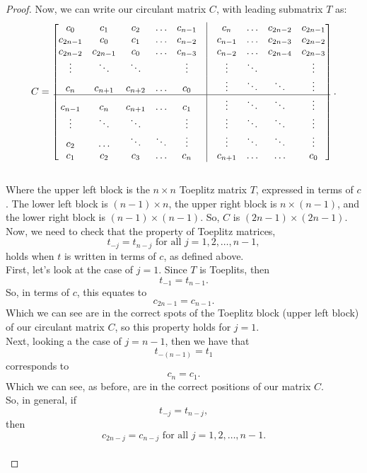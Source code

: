 \documentclass[12pt]{article}
\begin{document}
\begin{itemize}
\begin{proof}
Now, we can write our circulant matrix $C$, with leading submatrix $T$ as:\\

$$ C = \begin{bmatrix}
		c_0 & c_1 & c_2 & \hdots & c_{n-1} &\vline & c_n & \hdots & c_{2n-2} & c_{2n-1} \\
		c_{2n-1} & c_0 & c_1 & \hdots & c_{n-2} & \vline & c_{n-1} & \hdots & c_{2n-3} & c_{2n-2} \\
		c_{2n-2} & c_{2n-1} & c_0 & \hdots & c_{n-3} & \vline & c_{n-2} & \hdots & c_{2n-4} & c_{2n-3} \\
		\vdots & \ddots & \ddots & & \vdots & \vline & \vdots & \ddots & & \vdots \\
		c_n & c_{n+1} & c_{n+2} & \hdots & c_0 & \vline &  \vdots & \ddots & \ddots & \vdots \\
		\hline 
		c_{n-1} & c_n & c_{n+1} & \hdots & c_1 & \vline & \vdots & \ddots & \ddots & \vdots \\
		\vdots & \ddots & \ddots & & \vdots & \vline & \vdots & \ddots & \ddots & \vdots \\
		c_2 & \hdots & \ddots & \ddots & \vdots & \vline & \vdots & \ddots & \ddots & \vdots \\
		c_1 & c_2 & c_3 & \hdots & c_n & \vline & c_{n+1} & \hdots & \hdots & c_0
		\end{bmatrix}.$$\\
		
Where the upper left block is the $n\times n$ Toeplitz matrix $T$, expressed in terms of $c$.  The lower left block is $(n-1)\times n$, the upper right block is $n\times(n-1)$, and the lower right block is $(n-1) \times (n-1)$.  So, $C$ is $(2n-1) \times (2n-1)$.\\

Now, we need to check that the property of Toeplitz matrices,
$$t_{-j} = t_{n-j} \text{ for all } j=1,2, \dots , n-1,$$
holds when $t$ is written in terms of $c$, as defined above.\\

First, let's look at the case of $j=1$.  Since $T$ is Toeplits, then $$t_{-1} = t_{n-1}.$$  
So, in terms of $c$, this equates to 
$$c_{2n-1} = c_{n-1}.$$  
Which we can see are in the correct spots of the Toeplitz block (upper left block) of our circulant matrix $C$, so this property holds for $j=1$.\\

Next, looking a the case of $j=n-1$, then we have that 
$$t_{-(n-1)} = t_1$$
corresponds to 
$$c_n = c_1.$$
Which we can see, as before, are in the correct positions of our matrix $C$.\\
So, in general, if 
$$t_{-j} = t_{n-j},$$
then
$$c_{2n-j} = c_{n-j} \text{ for all } j=1, 2, \dots , n-1.$$\\


\end{proof}
\end{itemize}
\end{document}
